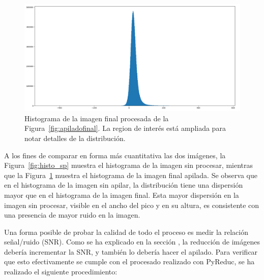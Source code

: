 \documentclass[a4paper, 12pt]{article}
\begin{document}
\begin{figure}[!h]
  \centering
  \includegraphics[width=\textwidth]{img/histo_final.png}
  \caption{\label{fig:histo_proc} Histograma de la imagen final procesada de la Figura~\ref{fig:apiladofinal}. La region de interés está ampliada para notar detalles de la distribución.}
\end{figure}

A los fines de comparar en forma más cuantitativa las dos imágenes, la Figura~\ref{fig:histo_sp} muestra el histograma de la imagen sin procesar, mientras que la Figura~\ref{fig:histo_proc} muestra el histograma de la imagen final apilada. Se observa que en el histograma de la imagen sin apilar, la distribución tiene una dispersión mayor que en el histograma de la imagen final. Esta mayor dispersión en la imagen sin procesar, visible en el ancho del pico y en su altura, es consistente con una presencia de mayor ruido en la imagen.

Una forma posible de probar la calidad de todo el proceso es medir la relación señal/ruido (SNR). Como se ha explicado en la sección \label{sec:tomas}, la reducción de imágenes debería incrementar la SNR, y también lo debería hacer el apilado. Para verificar que esto efectivamente se cumple con el procesado realizado con PyReduc, se ha realizado el siguiente procedimiento:
\end{document}
